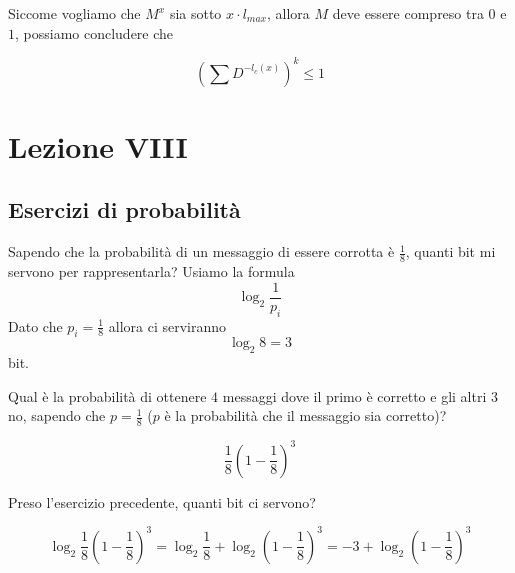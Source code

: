 \documentclass[12pt]{report}
\begin{document}
\begin{dimo}

        \noindent
        Siccome vogliamo che $M^x$ sia sotto $x \cdot l_{max}$, allora $M$ deve essere compreso tra $0$ e $1$, possiamo concludere che

        $$(\sum D^{-l_c(x)})^k \leq 1$$

    \end{dimo}

    \chapter{Lezione VIII}

    \section{Esercizi di probabilità}

    \begin{es}
        Sapendo che la probabilità di un messaggio
        di essere corrotta è $\frac{1}{8}$, quanti bit mi servono per rappresentarla?
        Usiamo la formula
        $$\log_2{\frac{1}{p_i}}$$
        Dato che $p_i = \frac{1}{8}$ allora ci serviranno
        $$\log_2{8} = 3$$
        bit.
    \end{es}

    \begin{es}
        Qual è la probabilità di ottenere $4$ messaggi dove il primo è corretto e gli altri $3$ no, sapendo che $p = \frac{1}{8}$ ($p$ è la probabilità che il messaggio sia corretto)?

        $$\frac{1}{8} (1 - \frac{1}{8})^3$$

    \end{es}

    \begin{es}
        Preso l'esercizio precedente, quanti bit ci servono?

        $$\log_2{\frac{1}{8} (1 - \frac{1}{8})^3} = \log_2{\frac{1}{8}} + \log_2{(1 - \frac{1}{8})^3} = -3 + \log_2{(1-\frac{1}{8})^3}$$
    \end{es}
\end{document}
